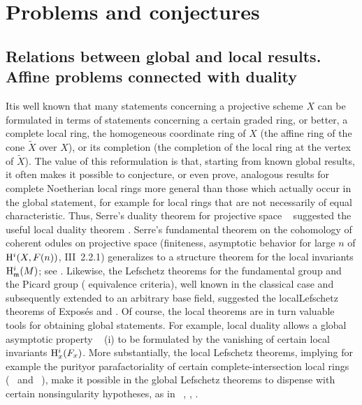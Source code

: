 \chapter{Problems and conjectures} \label{XIII}

\section[Relations between global and local results]
{Relations between global and local results. Affine problems connected with duality} \label{XIII.1}

It\pageoriginale is well known that many statements concerning a projective scheme
$X$ can be formulated in terms of statements concerning
a certain graded ring, or better, a complete local ring,
 the homogeneous coordinate ring
of $X$ (\ie the affine ring of the cone $\tilde{X}$ over
$X$), or its completion (\ie the completion of the local ring at the vertex
of $\tilde{X}$). The value of this reformulation is that,
starting from known global results, it often makes it possible to
conjecture, or even prove, analogous results for complete
Noetherian local rings more general than those which
actually occur in the global statement, for example for
local rings that are not necessarily of equal
characteristic. Thus, Serre's duality theorem for
projective space ~ suggested the useful
local duality theorem . Serre's
fundamental theorem on the cohomology of coherent
odules on projective space (finiteness,
asymptotic behavior for large $n$ of $\mathrm H^i(X,
F(n))$, {\cf \EGA III~2.2.1}) generalizes to a
structure theorem for the local invariants $\mathrm H^i_{\mathfrak{m}}(M)$; see
. Likewise, the Lefschetz theorems
for the fundamental group and the Picard group (\og
equivalence criteria\fg), well known in the
classical case and subsequently extended to an arbitrary base field,
suggested the \og local\fg Lefschetz theorems of Exposés
 and . Of course, the local theorems are in
turn valuable tools for obtaining global statements.
For example, local duality allows a global asymptotic property
~ (i) to be formulated by the vanishing
of certain local invariants $\mathrm H_x^i(F_x)$. More
substantially, the local Lefschetz theorems, implying for
example the \og purity\fg or parafactoriality of certain
complete-intersection local rings (~ and
~), make it possible in the global
Lefschetz theorems to dispense with certain nonsingularity
hypotheses, as in ~, ,
.

